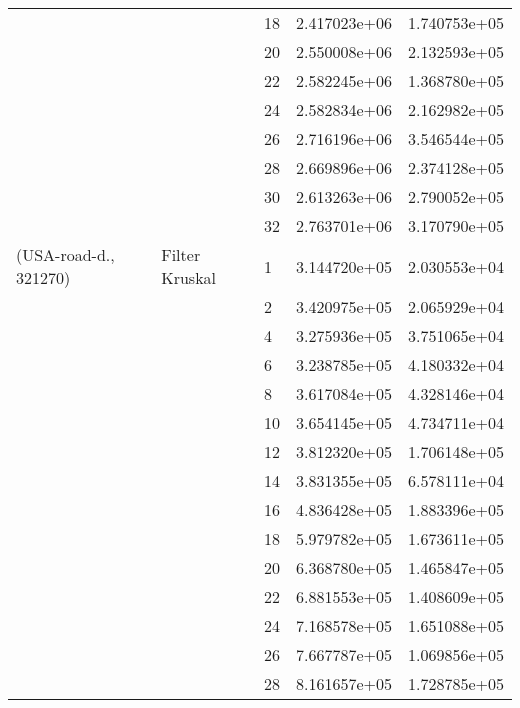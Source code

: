 \begin{tabular}{lllrr}
                      &            & 18 &  2.417023e+06 &  1.740753e+05 \\
                      &            & 20 &  2.550008e+06 &  2.132593e+05 \\
                      &            & 22 &  2.582245e+06 &  1.368780e+05 \\
                      &            & 24 &  2.582834e+06 &  2.162982e+05 \\
                      &            & 26 &  2.716196e+06 &  3.546544e+05 \\
                      &            & 28 &  2.669896e+06 &  2.374128e+05 \\
                      &            & 30 &  2.613263e+06 &  2.790052e+05 \\
                      &            & 32 &  2.763701e+06 &  3.170790e+05 \\
(USA-road-d., 321270) & Filter Kruskal & 1  &  3.144720e+05 &  2.030553e+04 \\
                      &            & 2  &  3.420975e+05 &  2.065929e+04 \\
                      &            & 4  &  3.275936e+05 &  3.751065e+04 \\
                      &            & 6  &  3.238785e+05 &  4.180332e+04 \\
                      &            & 8  &  3.617084e+05 &  4.328146e+04 \\
                      &            & 10 &  3.654145e+05 &  4.734711e+04 \\
                      &            & 12 &  3.812320e+05 &  1.706148e+05 \\
                      &            & 14 &  3.831355e+05 &  6.578111e+04 \\
                      &            & 16 &  4.836428e+05 &  1.883396e+05 \\
                      &            & 18 &  5.979782e+05 &  1.673611e+05 \\
                      &            & 20 &  6.368780e+05 &  1.465847e+05 \\
                      &            & 22 &  6.881553e+05 &  1.408609e+05 \\
                      &            & 24 &  7.168578e+05 &  1.651088e+05 \\
                      &            & 26 &  7.667787e+05 &  1.069856e+05 \\
                      &            & 28 &  8.161657e+05 &  1.728785e+05 \\

\end{tabular}
